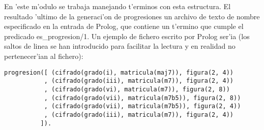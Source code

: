 En 'este m'odulo se trabaja manejando t'erminos con esta estructura. El resultado 'ultimo de la generaci'on de progresiones un archivo de texto de nombre especificado en la entrada de Prolog, que contiene un t'ermino que cumple el predicado es\_progresion/1. Un ejemplo de fichero escrito por Prolog ser'ia (los saltos de linea se han introducido para facilitar la lectura y en realidad no pertenecer'ian al fichero):
        \begin{verbatim}
progresion([ (cifrado(grado(i), matricula(maj7)), figura(2, 4))
           , (cifrado(grado(iii), matricula(m7)), figura(2, 4))
           , (cifrado(grado(vi), matricula(m7)), figura(2, 8))
           , (cifrado(grado(vii), matricula(m7b5)), figura(2, 8))
           , (cifrado(grado(vii), matricula(m7b5)), figura(2, 4))
           , (cifrado(grado(iii), matricula(m7)), figura(2, 4))
          ]).
        \end{verbatim}


